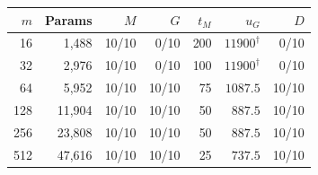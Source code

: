 \begin{tabular}{rrrrrrr}
\toprule
$m$ & Params & $M$ & $G$ & $t_M$ & $u_G$ & $D$ \\
\midrule
16 & 1,488 & 10/10 & 0/10 & 200 & $11900^{\dagger}$ & 0/10 \\
32 & 2,976 & 10/10 & 0/10 & 100 & $11900^{\dagger}$ & 0/10 \\
64 & 5,952 & 10/10 & 10/10 & 75 & $1087.5$ & 10/10 \\
128 & 11,904 & 10/10 & 10/10 & 50 & $887.5$ & 10/10 \\
256 & 23,808 & 10/10 & 10/10 & 50 & $887.5$ & 10/10 \\
512 & 47,616 & 10/10 & 10/10 & 25 & $737.5$ & 10/10 \\
\bottomrule
\end{tabular}
